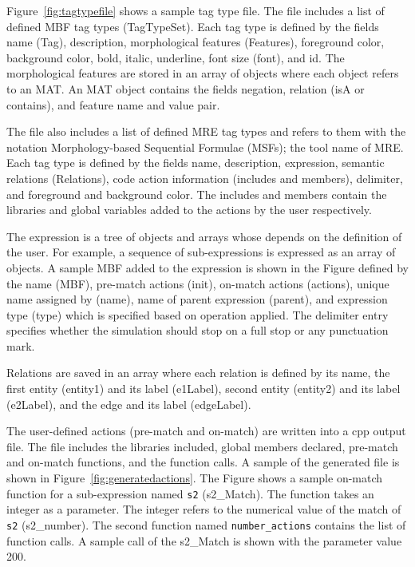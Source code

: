 Figure~\ref{fig:tagtypefile} shows a sample tag type file. 
The file includes a list of defined MBF tag types (TagTypeSet). 
Each tag type is defined by the fields name (Tag), description, 
morphological features (Features), foreground color, 
background color, bold, italic, underline, font size (font), and id. 
The morphological features are stored in an array of objects where each object refers to an MAT. 
An MAT object contains the fields negation, relation (isA or contains), and feature name and value pair.

The file also includes a list of defined MRE tag types and refers to them with the
notation Morphology-based Sequential Formulae (MSFs); the tool name of MRE. 
Each tag type is defined by the fields name, description, expression, 
semantic relations (Relations), code action information (includes and members), 
delimiter, and foreground and background color. 
The includes and members contain the libraries and global variables added to the actions by the user respectively. 

The expression is a tree of objects and arrays whose depends on the definition of the user. 
For example, a sequence of sub-expressions is expressed as an array of objects. 
A sample MBF added to the expression is shown in the Figure	defined by the name (MBF), pre-match actions (init), on-match actions (actions), unique name assigned by \framework(name), name of parent expression (parent), and expression type (type) which is specified based on operation applied. 
The delimiter entry specifies whether the simulation should stop on a full stop or any punctuation mark.

Relations are saved in an array where each relation is defined by its name, the first entity (entity1) and its label (e1Label), second entity (entity2) and its label (e2Label), and the edge and its label (edgeLabel).


The user-defined actions (pre-match and on-match) are written into a cpp output file. 
The file includes the libraries included, global members declared, pre-match and on-match functions, and the function calls. 
A sample of the generated file is shown in Figure~\ref{fig:generatedactions}. 
The Figure shows a sample on-match function for a sub-expression named {\tt s2} (s2\_Match). 
The function takes an integer as a parameter. 
The integer refers to the numerical value of the match of {\tt s2} (s2\_number). 
The second function named {\tt number\_actions} contains the list of function calls. 
A sample call of the s2\_Match is shown with the parameter value 200.

